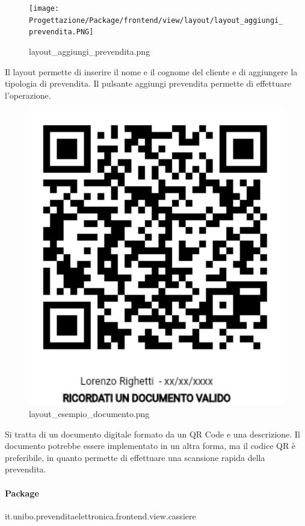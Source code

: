 \documentclass[a4paper]{article}
\begin{document}
\begin{figure}[H]
    \texttt{[image: Progettazione/Package/frontend/view/layout/layout\_aggiungi\_prevendita.PNG]}
    \centering
    \caption{layout\_aggiungi\_prevendita.png}
\end{figure}

Il layout permette di inserire il nome e il cognome del cliente e di aggiungere la tipologia di prevendita. Il pulsante aggiungi prevendita permette di effettuare l'operazione.

\begin{figure}[H]
    \includegraphics[scale=0.2]{Progettazione/esempio_documento.png}
    \centering
    \caption{layout\_esempio\_documento.png}
\end{figure}

Si tratta di un documento digitale formato da un QR Code e una descrizione. Il documento potrebbe essere implementato in un altra forma, ma il codice QR è preferibile, in quanto permette di effettuare una scansione rapida della prevendita.

\paragraph{Package} it.unibo.prevenditaelettronica.frontend.view.cassiere
\end{document}
